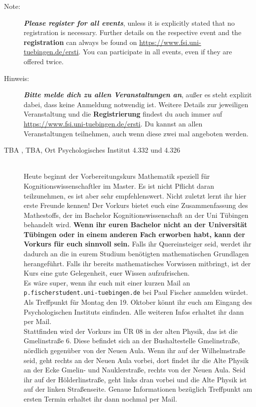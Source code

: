 \begin{description}
  \ifml
    \item[Note:] \textbf{\emph{Please register for all events}}, unless it is explicitly stated that no registration is necessary. Further details on the respective event and the \textbf{registration} can always be found on \url{https://www.fsi.uni-tuebingen.de/ersti}. You can participate in all events, even if they are offered twice.
  \else
    \item[Hinweis:] \textbf{\emph{Bitte melde dich zu allen Veranstaltungen an}}, außer es steht explizit dabei, dass keine Anmeldung notwendig ist. Weitere Details zur jeweiligen Veranstaltung und die \textbf{Registrierung} findest du auch immer auf \url{https://www.fsi.uni-tuebingen.de/ersti}. Du kannst an allen Veranstaltungen teilnehmen, auch wenn diese zwei mal angeboten werden.
  \fi

\ifkogwiss
    \ifmaster
       \item[TBA \YEAR, TBA, Ort Psychologisches Institut 4.332 und 4.326]\ \\
      Heute beginnt der Vorbereitungskurs Mathematik speziell für Kognitionswissenschaftler im Master. Es ist nicht Pflicht daran teilzunehmen, es ist aber sehr empfehlenswert. Nicht zuletzt lernt ihr hier erste Freunde kennen! Der Vorkurs bietet euch eine Zusammenfassung des Mathestoffs, der im Bachelor Kognitionswissenschaft an der Uni Tübingen behandelt wird.
      \textbf{Wenn ihr euren Bachelor nicht an der Universität Tübingen oder in einem anderen Fach erworben habt, kann der Vorkurs für euch sinnvoll sein.} Falls ihr Quereinsteiger seid, werdet ihr dadurch an die in eurem Studium benötigten mathematischen Grundlagen herangeführt. Falls ihr bereits mathematisches Vorwissen mitbringt, ist der Kurs eine gute Gelegenheit, euer Wissen aufzufrischen.\\
      Es wäre super, wenn ihr euch mit einer kurzen Mail an \texttt{p.fischer\At student.uni-tuebingen.de} bei Paul Fischer anmelden würdet. Als Treffpunkt für Montag den 19. Oktober könnt ihr euch am Eingang des Psychologischen Instituts einfinden. Alle weiteren Infos erhaltet ihr dann per Mail.\\

Stattfinden wird der Vorkurs im ÜR 08 in der alten Physik, das ist die Gmelinstraße 6. Diese befindet sich an der Bushaltestelle Gmelinstraße, nördlich gegenüber von der Neuen Aula. Wenn ihr auf der Wilhelmstraße seid, geht rechts an der Neuen Aula vorbei, dort findet ihr die Alte Physik an der Ecke Gmelin- und Nauklerstraße, rechts von der Neuen Aula. Seid ihr auf der Hölderlinstraße, geht links dran vorbei und die Alte Physik ist auf der linken Straßenseite. Genaue Informationen bezüglich Treffpunkt am ersten Termin erhaltet ihr dann nochmal per Mail.


\end{description}

